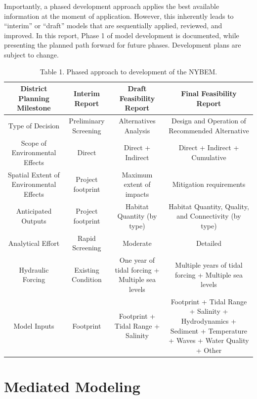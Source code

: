 \documentclass[
]{book}
\begin{document}
Importantly, a phased development approach applies the best available information at the moment of application. However, this inherently leads to ``interim'' or ``draft'' models that are sequentially applied, reviewed, and improved. In this report, Phase 1 of model development is documented, while presenting the planned path forward for future phases. Development plans are subject to change.

\begin{table}

\caption{\label{tab:unnamed-chunk-3}Table 1. Phased approach to development of the NYBEM.}
\centering
\begin{tabular}[t]{c|c|c|c}
\hline
District Planning Milestone & Interim Report & Draft Feasibility Report & Final Feasibility Report\\
\hline
Type of Decision & Preliminary Screening & Alternatives Analysis & Design and Operation of Recommended Alternative\\
\hline
Scope of Environmental Effects & Direct & Direct + Indirect & Direct + Indirect + Cumulative\\
\hline
Spatial Extent of Environmental Effects & Project footprint & Maximum extent of impacts & Mitigation requirements\\
\hline
Anticipated Outputs & Project footprint & Habitat Quantity (by type) & Habitat Quantity, Quality, and Connectivity (by type)\\
\hline
Analytical Effort & Rapid Screening & Moderate & Detailed\\
\hline
Hydraulic Forcing & Existing Condition & One year of tidal forcing + Multiple sea levels & Multiple years of tidal forcing + Multiple sea levels\\
\hline
Model Inputs & Footprint & Footprint + Tidal Range + Salinity & Footprint + Tidal Range + Salinity + Hydrodynamics + Sediment + Temperature + Waves + Water Quality + Other\\
\hline
\end{tabular}
\end{table}

\hypertarget{mediated-modeling}{%
\section{Mediated Modeling}\label{mediated-modeling}}
\end{document}
